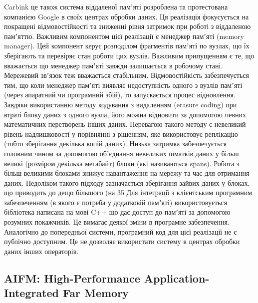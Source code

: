 Carbink це також система віддаленої памʼяті розроблена та протестована компанією Google в своїх центрах обробки даних. Ця реалізація фокусується на покращені відмовостійкості та зниженні рівня затримок при роботі з віддаленою памʼяттю.
Важливим компонентом цієї реалізації є менеджер памʼяті (memory manager). Цей компонент керує розподілом фрагментів памʼяті по вузлах, що їх зберігають та перевіряє стан роботи цих вузлів. Важливим припущенням є те, що вважається що менеджер памʼяті завжди залишається в робочому стані. Мережевий звʼязок теж вважається стабільним.
Відмовостійкість забезпечується тим, що коли менеджер памʼяті виявляє недоступність одного з вузлів памʼяті (через апаратний чи програмний збій), то запускається процес відновлення. Завдяки використанню методу кодування з видаленням (erasure coding) при втраті блоку даних з одного вузла, його можна відновити за допомогою певних математичних перетворень інших даних. Перевагою такого методу є невеликий рівень надлишковості у порівнянні з рішенням, яке використовує реплікацію (тобто зберігання декілька копій даних).
Низька затримка забезпечується головним чином за допомогою обʼєднання невеликих шматків даних у більш великі (розміром декілька мегабайт) блоки (які називаються spans). Робота з більш великими блоками знижує навантаження на мережу та час для отримання даних. Недоліком такого підходу зазначається зберігання зайвих даних у блоках, що приводить до дещо більшого (на 35%
Для інтеграції з клієнтським програмним забезпеченням (в якого є потреба у додатковій памʼяті) використовується бібліотека написана на мові C++ що дає доступ до памʼяті за допомогою розумних покажчиків. Це вимагає деякої зміни в програмне забезпечення.
Аналогічно до попередньої системи, програмний код для цієї реалізації не є публічно доступним. Це не дозволяє використати систему в центрах обробки даних інших операторів.

\subsection{AIFM: High-Performance Application-Integrated Far Memory}

